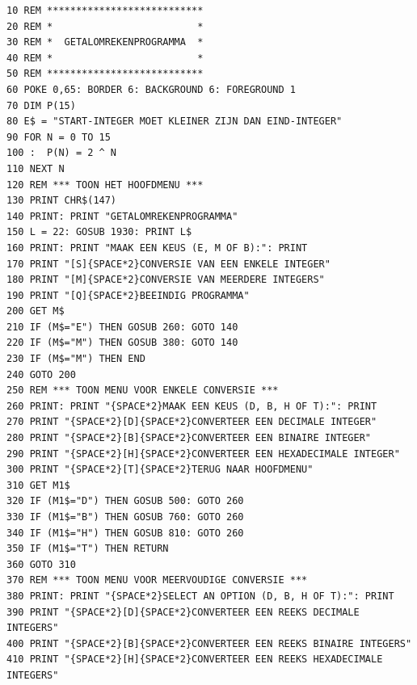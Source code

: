 \begin{tcolorbox}[colback=black,coltext=white]
\verbatimfont{\codefont}
\begin{verbatim}
10 REM ***************************
20 REM *                         *
30 REM *  GETALOMREKENPROGRAMMA  *
40 REM *                         *
50 REM ***************************
60 POKE 0,65: BORDER 6: BACKGROUND 6: FOREGROUND 1
70 DIM P(15)
80 E$ = "START-INTEGER MOET KLEINER ZIJN DAN EIND-INTEGER"
90 FOR N = 0 TO 15
100 :  P(N) = 2 ^ N
110 NEXT N
120 REM *** TOON HET HOOFDMENU ***
130 PRINT CHR$(147)
140 PRINT: PRINT "GETALOMREKENPROGRAMMA"
150 L = 22: GOSUB 1930: PRINT L$
160 PRINT: PRINT "MAAK EEN KEUS (E, M OF B):": PRINT
170 PRINT "[S]{SPACE*2}CONVERSIE VAN EEN ENKELE INTEGER"
180 PRINT "[M]{SPACE*2}CONVERSIE VAN MEERDERE INTEGERS"
190 PRINT "[Q]{SPACE*2}BEEINDIG PROGRAMMA"
200 GET M$
210 IF (M$="E") THEN GOSUB 260: GOTO 140
220 IF (M$="M") THEN GOSUB 380: GOTO 140
230 IF (M$="M") THEN END
240 GOTO 200
250 REM *** TOON MENU VOOR ENKELE CONVERSIE ***
260 PRINT: PRINT "{SPACE*2}MAAK EEN KEUS (D, B, H OF T):": PRINT
270 PRINT "{SPACE*2}[D]{SPACE*2}CONVERTEER EEN DECIMALE INTEGER"
280 PRINT "{SPACE*2}[B]{SPACE*2}CONVERTEER EEN BINAIRE INTEGER"
290 PRINT "{SPACE*2}[H]{SPACE*2}CONVERTEER EEN HEXADECIMALE INTEGER"
300 PRINT "{SPACE*2}[T]{SPACE*2}TERUG NAAR HOOFDMENU"
310 GET M1$
320 IF (M1$="D") THEN GOSUB 500: GOTO 260
330 IF (M1$="B") THEN GOSUB 760: GOTO 260
340 IF (M1$="H") THEN GOSUB 810: GOTO 260
350 IF (M1$="T") THEN RETURN
360 GOTO 310
370 REM *** TOON MENU VOOR MEERVOUDIGE CONVERSIE ***
380 PRINT: PRINT "{SPACE*2}SELECT AN OPTION (D, B, H OF T):": PRINT
390 PRINT "{SPACE*2}[D]{SPACE*2}CONVERTEER EEN REEKS DECIMALE INTEGERS"
400 PRINT "{SPACE*2}[B]{SPACE*2}CONVERTEER EEN REEKS BINAIRE INTEGERS"
410 PRINT "{SPACE*2}[H]{SPACE*2}CONVERTEER EEN REEKS HEXADECIMALE INTEGERS"
\end{verbatim}
\end{tcolorbox}
